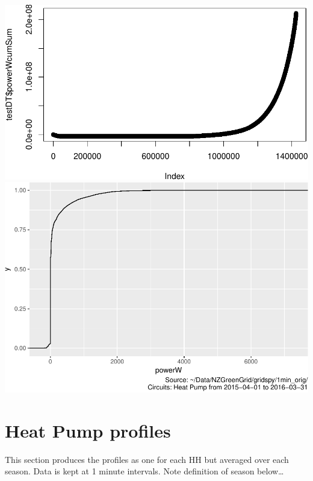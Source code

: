 \documentclass[]{article}
\begin{document}
\includegraphics{ggHeatPumpProfiles_files/figure-latex/cum sum-1.pdf}
\includegraphics{ggHeatPumpProfiles_files/figure-latex/cum sum-2.pdf}

\section{Heat Pump profiles}\label{heat-pump-profiles}

This section produces the profiles as one for each HH but averaged over
each season. Data is kept at 1 minute intervals. Note definition of
season below\ldots{}
\end{document}

